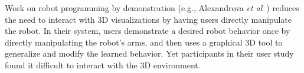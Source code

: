 \documentclass[10pt,twocolumn]{article}
\begin{document}
Work on robot programming by demonstration (e.g., Alexandrova {\sl et al}~\cite{cakmak-rss14}) reduces the need to interact with 3D visualizations by having users directly manipulate the robot. In their system, users demonstrate a desired robot behavior once by directly manipulating the robot's arms, and then uses a graphical 3D tool to generalize and modify the learned behavior. Yet participants in their user study found it difficult to interact with the 3D environment.

%
%
%
%
\end{document}
